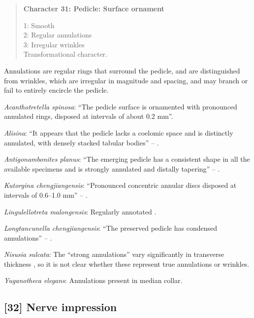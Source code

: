 \documentclass[openany]{book}
\theoremstyle{definition}
\theoremstyle{definition}
\theoremstyle{definition}
\theoremstyle{remark}
\begin{document}
\begin{quote}
\textbf{Character 31: Pedicle: Surface ornament}

1: Smooth\\
2: Regular annulations\\
3: Irregular wrinkles\\
Transformational character.
\end{quote}

Annulations are regular rings that surround the pedicle, and are
distinguished from wrinkles, which are irregular in magnitude and
spacing, and may branch or fail to entirely encircle the pedicle.

\hypertarget{Acanthotretella_spinosa-coding-31}{}
\emph{Acanthotretella spinosa}: ``The pedicle surface is ornamented with
pronounced annulated rings, disposed at intervals of about 0.2 mm''.

\hypertarget{Alisina-coding-31}{}
\emph{Alisina}: ``It appears that the pedicle lacks a coelomic space and
is distinctly annulated, with densely stacked tabular bodies'' --
\citet{Zhang2011Anobolellate}.

\hypertarget{Antigonambonites_planus-coding-31}{}
\emph{Antigonambonites planus}: ``The emerging pedicle has a consistent
shape in all the available specimens and is strongly annulated and
distally tapering'' -- \citet{Holmer2018Evolutionarysignificance}.

\hypertarget{Kutorgina_chengjiangensis-coding-31}{}
\emph{Kutorgina chengjiangensis}: ``Pronounced concentric annular discs
disposed at intervals of 0.6--1.0 mm'' --
\citet{Zhang2007Rhynchonelliformeanbrachiopods}.

\hypertarget{Lingulellotreta_malongensis-coding-31}{}
\emph{Lingulellotreta malongensis}: Regularly annotated \citep[see fig.
14.9 in][]{Hou2017Brachiopoda}.

\hypertarget{Longtancunella_chengjiangensis-coding-31}{}
\emph{Longtancunella chengjiangensis}: ``The preserved pedicle has
condensed annulations'' -- \citet{Zhang2011Theexceptionally}.

\hypertarget{Nisusia_sulcata-coding-31}{}
\emph{Nisusia sulcata}: The ``strong annulations'' vary significantly in
transverse thickness \citep{Holmer2018Evolutionarysignificance}, so it
is not clear whether these represent true annulations or wrinkles.

\hypertarget{Yuganotheca_elegans-coding-31}{}
\emph{Yuganotheca elegans}: Annulations present in median collar.

\subsection*{{[}32{]} Nerve impression}\label{nerve-impression}
\end{document}

